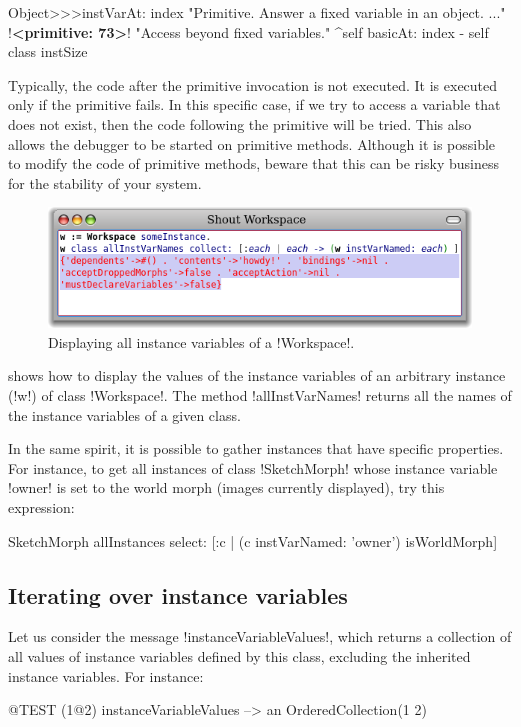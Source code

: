 \documentclass[a4paper,10pt,twoside]{book}
\begin{document}
\begin{code}{}
Object>>>instVarAt: index 
	"Primitive. Answer a fixed variable in an object. ..."
	!\textbf{<primitive: 73>}!
	"Access beyond fixed variables."
	^self basicAt: index - self class instSize		
\end{code}

Typically, the code after the primitive invocation is not executed.
It is executed only if the primitive fails. In this specific case, if we try to access a variable that does not exist, then the code following the primitive will be tried.
This also allows the debugger to be started on primitive methods.
Although it is possible to modify the code of primitive methods, beware that this can be risky business for the stability of your \pharo system.

\begin{figure}[ht]\centering
	\includegraphics[width=0.8\linewidth]{allInstanceVariables}
	\caption{Displaying all instance variables of a \ct!Workspace!.}
\end{figure}

 shows how to display the values of the instance variables of an arbitrary instance (\ct!w!) of class \ct!Workspace!.
The method \ct!allInstVarNames! returns all the names of the instance variables of a given class.

In the same spirit, it is possible to gather instances that have specific properties.
For instance, to get all instances of class \ct!SketchMorph! whose instance variable \ct!owner! is set to the world morph (\ie images currently displayed), try this expression:
\begin{code}{}
SketchMorph allInstances select: [:c | (c instVarNamed: 'owner') isWorldMorph]
\end{code}

\subsection{Iterating over instance variables}

Let us consider the message \ct!instanceVariableValues!, which returns a collection of all values of instance variables defined by this class, excluding the inherited instance variables.
For instance:
\begin{code}{@TEST}
(1@2) instanceVariableValues --> an OrderedCollection(1 2)
\end{code}
\end{document}
